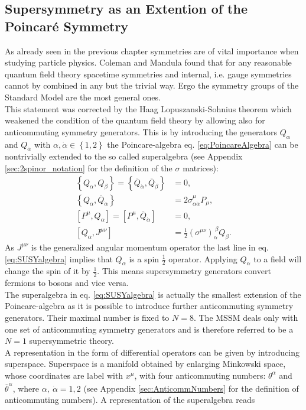 \subsection{Supersymmetry as an Extention of the Poincaré Symmetry}\label{sec:SUSYalgebra}
As already seen in the previous chapter symmetries are of vital importance when studying particle physics. Coleman and Mandula \cite{Coleman:1967ad} found that for any reasonable quantum field theory spacetime symmetries and internal, i.e. gauge symmetries cannot by combined in any but the trivial way. Ergo the symmetry groups of the Standard Model are the most general ones.\\
This statement was corrected by the Haag Lopuszanski-Sohnius theorem \cite{Haag:1974qh} which weakened the condition of the quantum field theory by allowing also for anticommuting symmetry generators. This is by introducing the generators $Q_\alpha$ and $Q_{\dot{\alpha}}$ with $\alpha, \dot{\alpha} \in \left\{ 1,2 \right\}$ the Poincare-algebra eq. \ref{eq:PoincareAlgebra} can be nontrivially extended to the so called superalgebra (see Appendix \ref{sec:2spinor_notation} for the definition of the $\sigma$ matrices):
\begin{align}
\left\{Q_\alpha,Q_\beta\right\} = \left\{\overline{Q}_{\dot{\alpha}},\overline{Q}_{\dot{\beta}}\right\} &= 0,  \nonumber\\
\left\{Q_\alpha,\overline{Q}_{\dot{\alpha}}\right\} &= 2\sigma^\mu_{\alpha\dot{\alpha}} P_\mu, \nonumber\\
[P^\mu,Q_\alpha] = [P^\mu,\overline{Q}_{\dot{\alpha}}] &= 0, \nonumber \\
[Q_\alpha, J^{\mu\nu}] &= \frac{1}{2} (\sigma^{\mu\nu})_\alpha^{\ \beta} Q_\beta.\label{eq:SUSYalgebra}
\end{align}
As $J^{\mu\nu}$ is the generalized angular momentum operator the last line in eq. \ref{eq:SUSYalgebra} implies that $Q_\alpha$ is a spin $\frac{1}{2}$ operator. Applying $Q_\alpha$ to a field will change the spin of it by $\frac{1}{2}$. This means supersymmetry generators convert fermions to bosons and vice versa.\\
The superalgebra in eq. \ref{eq:SUSYalgebra} is actually the smallest extension of the Poincare-algebra as it is possible to introduce further anticommuting symmetry generators. Their maximal number is fixed to $N = 8$. The MSSM deals only with one set of anticommuting symmetry generators and is therefore referred to be a $N = 1$ supersymmetric theory.\\
A representation in the form of differential operators can be given by introducing superspace. Superspace is a manifold obtained by enlarging Minkowski space, whose coordinates are label with $x^\mu$, with four anticommuting numbers: $\theta^\alpha$ and $\overline{\theta}^{\dot{\alpha}}$, where $\alpha,\ \dot{\alpha} = 1,2$ (see Appendix \ref{sec:AnticommNumbers} for the definition of anticommuting numbers). A representation of the superalgebra reads
